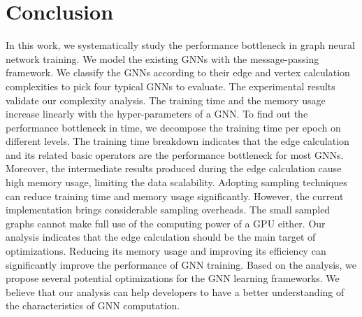 \section{Conclusion}
\label{sec:conclusion}

In this work, we systematically study the performance bottleneck in graph neural network training.
We model the existing GNNs with the message-passing framework.
We classify the GNNs according to their edge and vertex calculation complexities to pick four typical GNNs to evaluate.
The experimental results validate our complexity analysis.
The training time and the memory usage increase linearly with the hyper-parameters of a GNN.
To find out the performance bottleneck in time, we decompose the training time per epoch on different levels.
The training time breakdown indicates that the edge calculation and its related basic operators are the performance bottleneck for most GNNs.
Moreover, the intermediate results produced during the edge calculation cause high memory usage, limiting the data scalability.
Adopting sampling techniques can reduce training time and memory usage significantly.
However, the current implementation brings considerable sampling overheads.
The small sampled graphs cannot make full use of the computing power of a GPU either.
Our analysis indicates that the edge calculation should be the main target of optimizations.
Reducing its memory usage and improving its efficiency can significantly improve the performance of GNN training.
Based on the analysis, we propose several potential optimizations for the GNN learning frameworks.
We believe that our analysis can help developers to have a better understanding of the characteristics of GNN computation.
